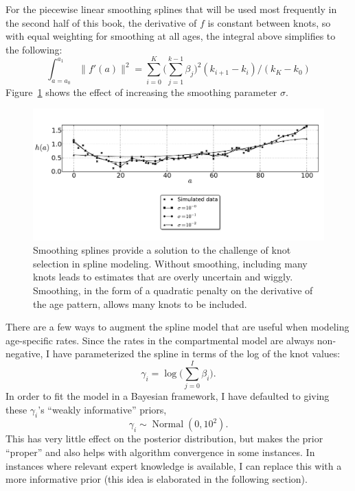 \documentclass[12pt]{article}
\newcommand{\1}{\mathbf{1}}
\newcommand{\0}{\mathbf{0}}
\newcommand{\Normal}{\operatorname{Normal}}
\begin{document}
For the piecewise linear smoothing splines that will be used most
frequently in the second half of this book, the derivative of $f$ is
constant between knots, so with equal weighting for smoothing at all
ages, the integral above simplifies to the following:
\[
\int _{a=a_0} ^{a_1} \| f'(a) \|^2 = \sum_{i=0} ^K \bigg(\sum_{j=1} ^{k-1} \beta_j\bigg)^2(k_{i+1}-k_i) / (k_K - k_0)
\]
Figure~\ref{smoothing-splines} shows the effect of increasing the
smoothing parameter $\sigma$.

\begin{figure}[h]
\begin{center}
\includegraphics[width=\textwidth]{smoothing-splines.pdf}
\caption{Smoothing splines provide a solution to the challenge of knot
  selection in spline modeling.  Without smoothing, including many
  knots leads to estimates that are overly uncertain and wiggly.
  Smoothing, in the form of a quadratic penalty on the derivative of
  the age pattern, allows many knots to be included.}
\label{smoothing-splines}
\end{center}
\end{figure}

There are a few ways to augment the spline model that are useful when
modeling age-specific rates. Since the rates in the compartmental
model are always non-negative, I have parameterized the spline in
terms of the log of the knot values:
\[
\gamma_i = \log\bigg(\sum_{j=0}^I \beta_i\bigg).
\]
In order to fit the model in a Bayesian framework, I have defaulted to
giving these $\gamma_i$'s ``weakly informative'' priors,
\[
\gamma_i \sim \Normal\left(0, 10^2\right).
\]
This has very little effect on the posterior distribution, but makes
the prior ``proper'' and also helps with algorithm convergence in
some instances. In instances where relevant expert knowledge is
available, I can replace this with a more informative prior (this idea
is elaborated in the following section).
\end{document}
